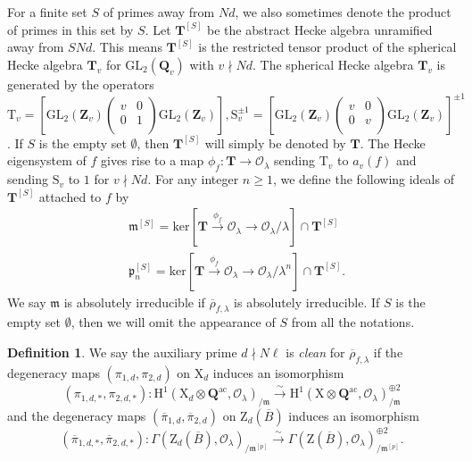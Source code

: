 \documentclass[10pt]{amsart}
\newcommand*\Z{\mathds{Z}}
\newcommand*\ZZ{|[draw,circle]| \Z_2}
\numberwithin{equation}{section}
\theoremstyle{plain}
\numberwithin{equation}{section}
\theoremstyle{definition}
\newtheorem{definition}[theorem]{Definition}
\theoremstyle{remark}
\def\GL{\mathrm{GL}}
\def\ac{\mathrm{ac}}
\def\frakm{\mathfrak{m}}
\def\ac{\mathrm{ac}}
\def\calO{\mathcal{O}}
\def\frakm{\mathfrak{m}}
\def\frakp{\mathfrak{p}}
\def\QQ{\mathbf{Q}}
\def\TT{\mathbf{T}}
\def\ZZ{\mathbf{Z}}
\def\rmH{\mathrm{H}}
\def\rmX{\mathrm{X}}
\def\rmS{\mathrm{S}}
\def\rmT{\mathrm{T}}
\def\rmZ{\mathrm{Z}}
\begin{document}
For a finite set $S$ of primes away from $Nd$, we also sometimes denote the product of primes in this set by $S$.  Let $\TT^{[S]}$ be the abstract Hecke algebra unramified away from $SNd$. This means $\TT^{[S]}$ is the restricted tensor product of the spherical Hecke algebra $\TT_{v}$ for $\GL_{2}(\QQ_{v})$ with $v\nmid Nd$. The spherical Hecke algebra $\TT_{v}$ is generated by the operators $\rmT_{v}=[\GL_{2}(\ZZ_{v})\begin{pmatrix}v& 0\\ 0&1\\ \end{pmatrix}\GL_{2}(\ZZ_{v})], \rmS^{\pm 1}_{v}=[\GL_{2}(\ZZ_{v})\begin{pmatrix}v& 0\\ 0&v\\ \end{pmatrix}\GL_{2}(\ZZ_{v})]^{\pm 1}$. If $S$ is the empty set $\emptyset$, then $\TT^{[S]}$ will simply be denoted by $\TT$. The Hecke eigensystem of $f$ gives rise to a map
$\phi_{f}: \TT \rightarrow \calO_{\lambda}$ sending $\rmT_{v}$ to $a_{v}(f)$ and sending $\rmS_{v}$ to $1$ for $v\nmid Nd$.  For any integer $n\geq1$, we define the following ideals of  $\TT^{[S]}$ attached to $f$ by
\begin{equation}\label{ideals}
\begin{aligned}
&\frakm^{[S]}=\mathrm{ker}[\TT \xrightarrow{\phi_{f}} \calO_{\lambda}\rightarrow \calO_{\lambda}/\lambda]\cap\TT^{[S]}\\ 
&\frakp^{[S]}_{n}=\mathrm{ker}[\TT\xrightarrow{\phi_{f}}\calO_{\lambda}\rightarrow \calO_{\lambda}/\lambda^{n}]\cap\TT^{[S]}.
\end{aligned}
\end{equation}
We say $\frakm$ is absolutely irreducible if $\overline{\rho}_{f,\lambda}$ is absolutely irreducible. If $S$ is the empty set $\emptyset$, then we will omit the appearance of $S$ from all the notations.

\begin{definition}\label{clean}
 We say the auxiliary prime $d\nmid N\ell$ is \emph{clean} for $\overline{\rho}_{f,\lambda}$ if the degeneracy maps $(\pi_{1,d}, \pi_{2,d})$ on $\rmX_{d}$ induces an isomorphism
\begin{equation*}
(\pi_{1,d, \ast}, \pi_{2,d, \ast}): \rmH^{1}(\rmX_{d}\otimes\QQ^{\ac},\calO_{\lambda})_{/\frakm}\xrightarrow{\sim}  \rmH^{1}(\rmX\otimes{\QQ^{\ac}},\calO_{\lambda})^{\oplus 2}_{/\frakm}
\end{equation*}
and the degeneracy maps $(\overline{\pi}_{1,d}, \overline{\pi}_{2,d})$ on $\rmZ_{d}(\overline{B})$ induces an isomorphism
\begin{equation*}
(\overline{\pi}_{1,d, \ast}, \overline{\pi}_{2,d, \ast}): \Gamma(\rmZ_{d}(\overline{B}),\calO_{\lambda})_{/\frakm^{[p]}}\xrightarrow{\sim}  \Gamma(\rmZ(\overline{B}),\calO_{\lambda})^{\oplus 2}_{/\frakm^{[p]}}.
\end{equation*}
\end{definition}
\end{document}
